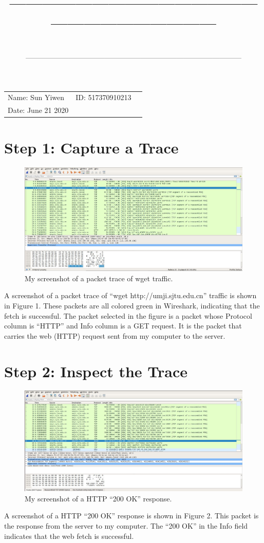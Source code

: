 \documentclass[a4paper]{article}
\title{—————————————————————————\\ \sc{UM-SJTU Joint Institute}}
\author{\sc{Computer Networks}}
\date{\sc{(Ve489)}\\——————————————————————————————}
\begin{document}
\maketitle
\vspace{5cm}
\centerline{\Large{}}
\vspace{9cm}
\begin{tabular}{lll}
\qquad \qquad Name: Sun Yiwen&ID: 517370910213\\
\qquad \qquad Date: June 21 2020
\end{tabular}

\newpage
\section{Step 1: Capture a Trace}
\begin{figure}[htbp]
\centering
\includegraphics[scale=0.5]{1.jpg}
\caption{My screenshot of a packet trace of wget traffic.}
\end{figure}
A screenshot of a packet trace of “wget http://umji.sjtu.edu.cn” traffic is shown in Figure 1. These packets are all colored green in Wireshark, indicating that the fetch is successful. The packet selected in the figure is a packet whose Protocol column is “HTTP” and Info column is a GET request. It is the packet that carries the web (HTTP) request sent from my computer to the server.

\section{Step 2: Inspect the Trace}
\begin{figure}[htbp]
\centering
\includegraphics[scale=0.5]{2.jpg}
\caption{My screenshot of a HTTP “200 OK” response.}
\end{figure}
A screenshot of a HTTP “200 OK” response is shown in Figure 2. This packet is the response from the server to my computer. The “200 OK” in the Info field indicates that the web fetch is successful.
\end{document}
